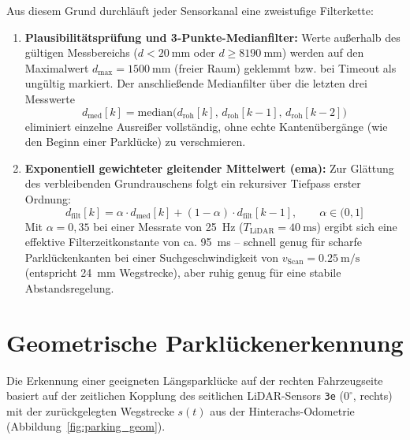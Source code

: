 Aus diesem Grund durchläuft jeder Sensorkanal eine zweistufige Filterkette:
\begin{enumerate}
  \item \textbf{Plausibilitätsprüfung und 3-Punkte-Medianfilter:} Werte außerhalb des gültigen Messbereichs ($d < \qty{20}{\milli\meter}$ oder $d \ge \qty{8190}{\milli\meter}$) werden auf den Maximalwert $d_{\max} = \qty{1500}{\milli\meter}$ (freier Raum) geklemmt bzw. bei Timeout als ungültig markiert. Der anschließende Medianfilter über die letzten drei Messwerte
  \begin{equation}
    d_{\mathrm{med}}[k] = \mathrm{median}\bigl(d_{\mathrm{roh}}[k],\, d_{\mathrm{roh}}[k-1],\, d_{\mathrm{roh}}[k-2]\bigr)
    \label{eq:median}
  \end{equation}
  eliminiert einzelne Ausreißer vollständig, ohne echte Kantenübergänge (wie den Beginn einer Parklücke) zu verschmieren.
  \item \textbf{Exponentiell gewichteter gleitender Mittelwert (\gls{ema}):} Zur Glättung des verbleibenden Grundrauschens folgt ein rekursiver Tiefpass erster Ordnung:
  \begin{equation}
    d_{\mathrm{filt}}[k] = \alpha \cdot d_{\mathrm{med}}[k] + (1 - \alpha) \cdot d_{\mathrm{filt}}[k-1], \qquad \alpha \in (0, 1]
    \label{eq:ema}
  \end{equation}
  Mit $\alpha = 0{,}35$ bei einer Messrate von \qty{25}{\hertz} ($T_{\mathrm{LiDAR}} = \qty{40}{\milli\second}$) ergibt sich eine effektive Filterzeitkonstante von ca. \qty{95}{\milli\second} -- schnell genug für scharfe Parklückenkanten bei einer Suchgeschwindigkeit von $v_{\mathrm{Scan}} = \qty{0,25}{\meter\per\second}$ (entspricht \qty{24}{\milli\meter} Wegstrecke), aber ruhig genug für eine stabile Abstandsregelung.
\end{enumerate}

\section{Geometrische Parklückenerkennung}
\label{sec:parkluecke}
Die Erkennung einer geeigneten Längsparklücke auf der rechten Fahrzeugseite basiert auf der zeitlichen Kopplung des seitlichen LiDAR-Sensors \texttt{3e} ($0^\circ$, rechts) mit der zurückgelegten Wegstrecke $s(t)$ aus der Hinterachs-Odometrie (Abbildung~\ref{fig:parking_geom}).

